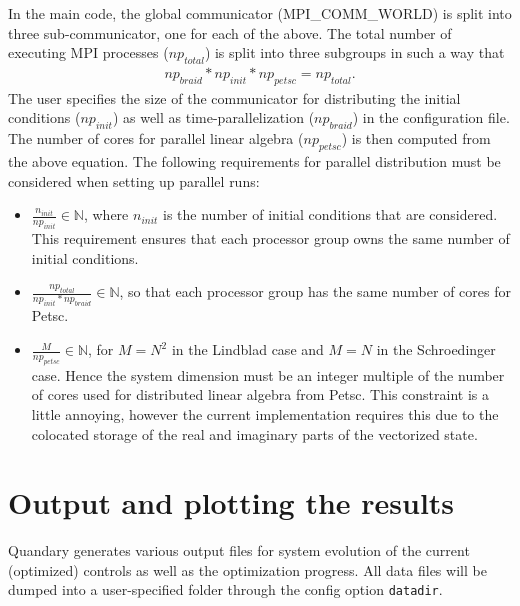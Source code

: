 \documentclass[11pt]{article}
\begin{document}
    In the main code, the global communicator (MPI\_COMM\_WORLD) is split into
    three sub-communicator, one for each of the above. The total number of executing MPI
    processes ($np_{total}$) is split into three subgroups in such a way that 
    \begin{align*}
      np_{braid} * np_{init} * np_{petsc} = np_{total}.
    \end{align*}
    The user specifies the size of the communicator for distributing the
    initial conditions ($np_{init}$) as well as time-parallelization
    ($np_{braid}$) in the configuration file. The number of cores for parallel linear
    algebra ($np_{petsc}$) is then computed from the above equation. The
    following requirements for parallel distribution must be considered when
    setting up parallel runs:
    \begin{itemize}
    \item $\frac{n_{init}}{np_{init}} \in \mathds{N}$, where $n_{init}$ is
      the number of initial conditions that are considered. This requirement
      ensures that each processor group owns the same number of initial
      conditions.
    \item $\frac{np_{total}}{np_{init}*np_{braid}} \in \mathds{N}$, so that
      each processor group has the same number of cores for Petsc.
    \item $\frac{M}{np_{petsc}} \in \mathds{N}$, for $M=N^2$ in the Lindblad case and $M=N$ in the Schroedinger case. Hence the system dimension must be an integer multiple of the number of cores used for
      distributed linear algebra from Petsc. This constraint is a little
      annoying, however the current implementation requires this due to the
      colocated storage of the real and imaginary parts of the vectorized
      state.
    \end{itemize}
 
\section{Output and plotting the results}
Quandary generates various output files for system evolution of the current (optimized) controls as well as the optimization progress. All data files will be dumped into a user-specified folder through the config option \texttt{datadir}. 
\end{document}
